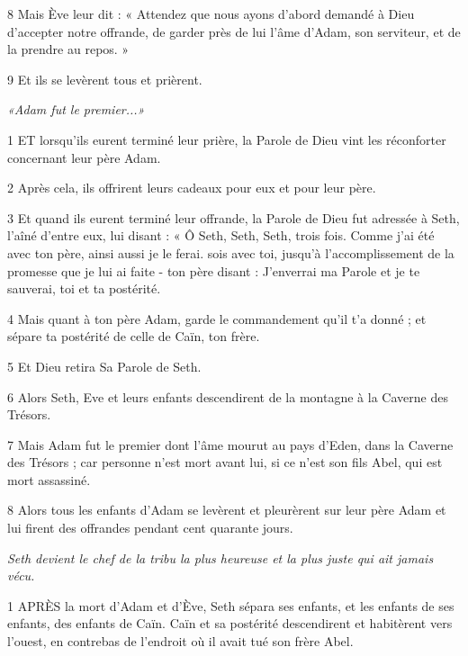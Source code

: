 \par 8 Mais Ève leur dit : « Attendez que nous ayons d'abord demandé à Dieu d'accepter notre offrande, de garder près de lui l'âme d'Adam, son serviteur, et de la prendre au repos. »

\par 9 Et ils se levèrent tous et prièrent.


\par \textit{«Adam fut le premier...»}

\par 1 ET lorsqu'ils eurent terminé leur prière, la Parole de Dieu vint les réconforter concernant leur père Adam.

\par 2 Après cela, ils offrirent leurs cadeaux pour eux et pour leur père.

\par 3 Et quand ils eurent terminé leur offrande, la Parole de Dieu fut adressée à Seth, l'aîné d'entre eux, lui disant : « Ô Seth, Seth, Seth, trois fois. Comme j'ai été avec ton père, ainsi aussi je le ferai. sois avec toi, jusqu'à l'accomplissement de la promesse que je lui ai faite - ton père disant : J'enverrai ma Parole et je te sauverai, toi et ta postérité.

\par 4 Mais quant à ton père Adam, garde le commandement qu'il t'a donné ; et sépare ta postérité de celle de Caïn, ton frère.

\par 5 Et Dieu retira Sa Parole de Seth.

\par 6 Alors Seth, Eve et leurs enfants descendirent de la montagne à la Caverne des Trésors.

\par 7 Mais Adam fut le premier dont l'âme mourut au pays d'Eden, dans la Caverne des Trésors ; car personne n'est mort avant lui, si ce n'est son fils Abel, qui est mort assassiné.

\par 8 Alors tous les enfants d'Adam se levèrent et pleurèrent sur leur père Adam et lui firent des offrandes pendant cent quarante jours.


\par \textit{Seth devient le chef de la tribu la plus heureuse et la plus juste qui ait jamais vécu.}

\par 1 APRÈS la mort d'Adam et d'Ève, Seth sépara ses enfants, et les enfants de ses enfants, des enfants de Caïn. Caïn et sa postérité descendirent et habitèrent vers l'ouest, en contrebas de l'endroit où il avait tué son frère Abel.

